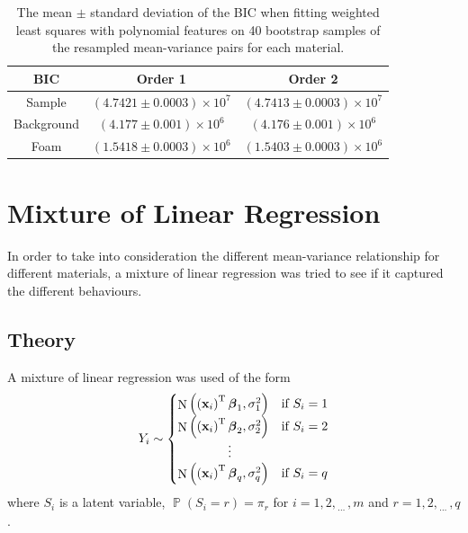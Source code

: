 \documentclass[12pt]{report}
\DeclareMathOperator{\prob}{\mathbb{P}}
\DeclareMathOperator{\normal}{N}
\newcommand{\T}{^\textup{T}}
\newcommand{\dotdotdot}{_{\phantom{.}\cdots}}
\newcommand{\vect}[1]{\mathbf{#1}}
\newcommand{\vectGreek}[1]{\boldsymbol{#1}}
\begin{document}
\begin{table}
	\centering
	\begin{tabular}{ c | c c  }
		BIC & Order 1 & Order 2 \\
		\hline
		Sample & $(4.7421\pm0.0003)\times 10^7$ & $(4.7413\pm0.0003)\times 10^7$ \\
		Background & $(4.177\pm0.001)\times 10^6$ & $(4.176\pm0.001)\times 10^6$ \\
		Foam & $(1.5418\pm0.0003)\times 10^6$ & $(1.5403\pm0.0003)\times 10^6$
	\end{tabular}
	\caption{The mean $\pm$ standard deviation of the BIC when fitting weighted least squares with polynomial features on 40 bootstrap samples of the resampled mean-variance pairs for each material.}
	\label{table:subsample_BIC}
\end{table}

\section{Mixture of Linear Regression}

In order to take into consideration the different mean-variance relationship for different materials, a mixture of linear regression was tried to see if it captured the different behaviours.

\subsection{Theory}
A mixture of linear regression was used of the form
\begin{equation}
Y_i\sim
\begin{cases}
\normal\left(\left(\vect{x}_i\right)\T\vectGreek{\beta}_1,\sigma_1^2\right) & \text{if }S_i=1\\ 
\normal\left(\left(\vect{x}_i\right)\T\vectGreek{\beta}_2,\sigma_2^2\right) & \text{if }S_i=2\\
\qquad\qquad\vdots\\
\normal\left(\left(\vect{x}_i\right)\T\vectGreek{\beta}_q,\sigma_q^2\right) & \text{if }S_i=q\\
\end{cases}
\end{equation}
where $S_i$ is a latent variable, $\prob\left(S_i=r\right)=\pi_r$ for $i=1,2,\dotdotdot,m$ and $r=1,2,\dotdotdot,q$.
\end{document}
